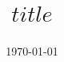 \documentclass[11pt,a4paper,oneside]{book}
\begin{document}
\title{$title$}
\author{}
\date{\today}
\maketitle
\tableofcontents
\newpage
\end{document}
